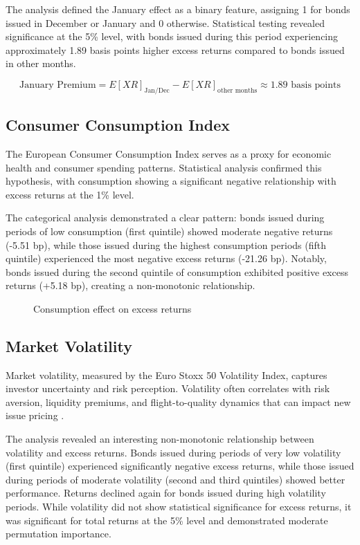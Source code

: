 The analysis defined the January effect as a binary feature, assigning 1 for bonds issued in December or January and 0 otherwise. Statistical testing revealed significance at the 5\% level, with bonds issued during this period experiencing approximately 1.89 basis points higher excess returns compared to bonds issued in other months.

$$\text{January Premium} = E[XR]_{\text{Jan/Dec}} - E[XR]_{\text{other months}} \approx 1.89 \text{ basis points}$$

\subsection{Consumer Consumption Index}

The European Consumer Consumption Index serves as a proxy for economic health and consumer spending patterns. Statistical analysis confirmed this hypothesis, with consumption showing a significant negative relationship with excess returns at the 1\% level.

The categorical analysis demonstrated a clear pattern: bonds issued during periods of low consumption (first quintile) showed moderate negative returns (-5.51 bp), while those issued during the highest consumption periods (fifth quintile) experienced the most negative excess returns (-21.26 bp). Notably, bonds issued during the second quintile of consumption exhibited positive excess returns (+5.18 bp), creating a non-monotonic relationship.

\begin{figure}[h]
    \begin{center}
        
    \end{center}
    \caption{Consumption effect on excess returns}
    \label{fig:consumption}
\end{figure}

\subsection{Market Volatility}

Market volatility, measured by the Euro Stoxx 50 Volatility Index, captures investor uncertainty and risk perception. Volatility often correlates with risk aversion, liquidity premiums, and flight-to-quality dynamics that can impact new issue pricing \parencite{Thank2004FlightRisk}.

The analysis revealed an interesting non-monotonic relationship between volatility and excess returns. Bonds issued during periods of very low volatility (first quintile) experienced significantly negative excess returns, while those issued during periods of moderate volatility (second and third quintiles) showed better performance. Returns declined again for bonds issued during high volatility periods. While volatility did not show statistical significance for excess returns, it was significant for total returns at the 5\% level and demonstrated moderate permutation importance.

